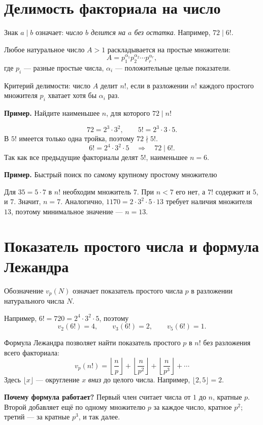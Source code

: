 \documentclass[a4paper,11pt]{article}
\newcommand{\key}[1]{\textcolor{deepaccent}{#1}}
\newcommand{\ex}[1]{\par\medskip\textcolor{deepaccent}{\textbf{Пример.} #1}\par\smallskip}
\newcommand{\nuval}[2]{v_{#1}(#2)}
\begin{document}
\section{Делимость факториала на число}
Знак $a\mid b$ означает: \textit{число $b$ делится на $a$ без остатка}. Например, $72\mid 6!$.

Любое натуральное число $A>1$ раскладывается на простые множители:
\[
 A=p_1^{\alpha_1}p_2^{\alpha_2}\cdots p_r^{\alpha_r},
\]
где $p_i$ --- разные простые числа, $\alpha_i$ --- положительные целые показатели.

\key{Критерий делимости:} число $A$ делит $n!$, если в разложении $n!$ каждого простого множителя $p_i$ хватает хотя бы $\alpha_i$ раз.

\ex{Найдите наименьшее $n$, для которого $72\mid n!$}
\[
72=2^3\cdot3^2,\qquad
5!=2^3\cdot3\cdot5.
\]
В $5!$ имеется только одна тройка, поэтому $72\nmid5!$.
\[
6!=2^4\cdot3^2\cdot5\quad\Longrightarrow\quad72\mid6!.
\]
Так как все предыдущие факториалы делят $5!$, \key{наименьшее $n=6$}.

\ex{Быстрый поиск по самому крупному простому множителю}
Для $35=5\cdot7$ в $n!$ необходим множитель $7$. При $n<7$ его нет, а $7!$ содержит и $5$, и $7$. Значит, \key{$n=7$}. Аналогично, $1170=2\cdot3^2\cdot5\cdot13$ требует наличия множителя $13$, поэтому минимальное значение --- \key{$n=13$}.

\clearpage
\section{Показатель простого числа и формула Лежандра}
Обозначение $\nuval{p}{N}$ означает \key{показатель простого числа $p$} в разложении натурального числа $N$.

Например, $6!=720=2^4\cdot3^2\cdot5$, поэтому
\[
\nuval{2}{6!}=4,\qquad \nuval{3}{6!}=2,\qquad \nuval{5}{6!}=1.
\]

\key{Формула Лежандра} позволяет найти показатель простого $p$ в $n!$ без разложения всего факториала:
\[
\boxed{\displaystyle
\nuval{p}{n!}=\left\lfloor\frac np\right\rfloor+
\left\lfloor\frac n{p^2}\right\rfloor+
\left\lfloor\frac n{p^3}\right\rfloor+\cdots}
\]
Здесь $\lfloor x\rfloor$ --- округление $x$ \textit{вниз} до целого числа. Например, $\lfloor2{,}5\rfloor=2$.

\textbf{Почему формула работает?} Первый член считает числа от $1$ до $n$, кратные $p$. Второй добавляет ещё по одному множителю $p$ за каждое число, кратное $p^2$; третий --- за кратные $p^3$, и так далее.
\end{document}
